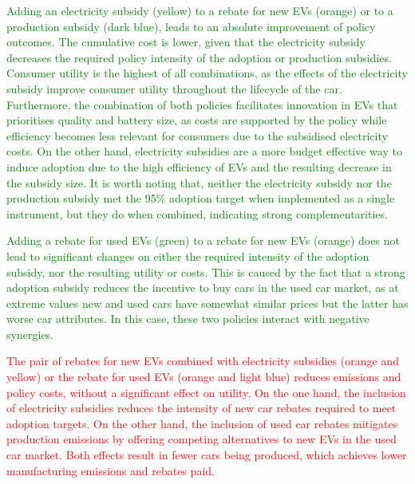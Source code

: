 \documentclass[12pt]{article}
\begin{document}
    \textcolor{green}{Adding an electricity subsidy (yellow) to a rebate for new EVs (orange) or to a production subsidy (dark blue), leads to an absolute improvement of policy outcomes. The cumulative cost is lower, given that the electricity subsidy decreases the required policy intensity of the adoption or production subsidies. Consumer utility is the highest of all combinations, as the effects of the electricity subsidy improve consumer utility throughout the lifecycle of the car. Furthermore, the combination of both policies facilitates innovation in EVs that prioritises quality and battery size, as costs are supported by the policy while efficiency becomes less relevant for consumers due to the subsidised electricity costs. On the other hand, electricity subsidies are a more budget effective way to induce adoption due to the high efficiency of EVs and the resulting decrease in the subsidy size. It is worth noting that, neither the electricity subsidy nor the production subsidy met the 95\% adoption target when implemented as a single instrument, but they do when combined, indicating strong complementarities.}

    \textcolor{green}{Adding a rebate for used EVs (green) to a rebate for new EVs (orange) does not lead to significant changes on either the required intensity of the adoption subsidy, nor the resulting utility or costs. This is caused by the fact that a strong adoption subsidy reduces the incentive to buy cars in the used car market, as at extreme values new and used cars have somewhat similar prices but the latter has worse car attributes. In this case, these two policies interact with negative synergies.}
    
	\textcolor{red}{The pair of rebates for new EVs combined with electricity subsidies (orange and yellow) or the rebate for used EVs (orange and light blue) reduces emissions and policy costs, without a significant effect on utility. On the one hand, the inclusion of electricity subsidies reduces the intensity of new car rebates required to meet adoption targets. On the other hand, the inclusion of used car rebates mitigates production emissions by offering competing alternatives to new EVs in the used car market. Both effects result in fewer cars being produced, which achieves lower manufacturing emissions and rebates paid.}
	
\end{document}
